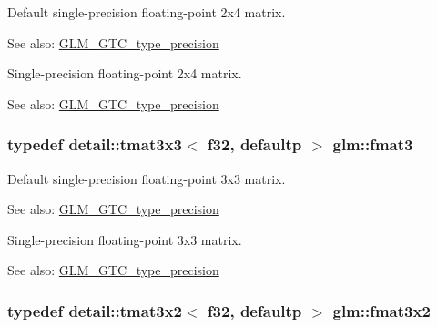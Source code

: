 Default single-precision floating-point 2x4 matrix. \begin{Desc}
\item[See also:]\hyperlink{group__gtc__type__precision}{GLM\_\-GTC\_\-type\_\-precision}\end{Desc}
Single-precision floating-point 2x4 matrix. \begin{Desc}
\item[See also:]\hyperlink{group__gtc__type__precision}{GLM\_\-GTC\_\-type\_\-precision} \end{Desc}
\hypertarget{group__gtc__type__precision_ga7b09502b183884aca53338c35b09509}{
\subsubsection[fmat3]{\setlength{\rightskip}{0pt plus 5cm}typedef detail::tmat3x3$<$ f32, defaultp $>$ {\bf glm::fmat3}}}
\label{group__gtc__type__precision_ga7b09502b183884aca53338c35b09509}


Default single-precision floating-point 3x3 matrix. \begin{Desc}
\item[See also:]\hyperlink{group__gtc__type__precision}{GLM\_\-GTC\_\-type\_\-precision}\end{Desc}
Single-precision floating-point 3x3 matrix. \begin{Desc}
\item[See also:]\hyperlink{group__gtc__type__precision}{GLM\_\-GTC\_\-type\_\-precision} \end{Desc}
\hypertarget{group__gtc__type__precision_g723b6e3dd4ff1c0d76d3c9f72ea0d9a7}{
\subsubsection[fmat3x2]{\setlength{\rightskip}{0pt plus 5cm}typedef detail::tmat3x2$<$ f32, defaultp $>$ {\bf glm::fmat3x2}}}
\label{group__gtc__type__precision_g723b6e3dd4ff1c0d76d3c9f72ea0d9a7}


